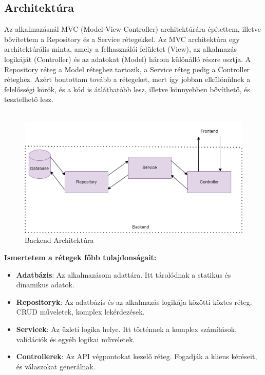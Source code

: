 \subsection*{Architektúra}
Az alkalmazásnál MVC (Model-View-Controller) architektúrára építettem, illetve
bővítettem a Repository és a Service rétegekkel. Az MVC architektúra egy
architektúrális minta, amely a felhasználói felületet (View), az alkalmazás
logikáját (Controller) és az adatokat (Model) három különálló részre osztja.
A Repository réteg a Model réteghez tartozik, a Service réteg pedig a Controller réteghez.
Azért bontottam tovább a rétegeket, mert így jobban elkülönülnek a felelősségi körök,
és a kód is átláthatóbb lesz, illetve könnyebben bővíthető, és tesztelhető lesz.
\\
\\
\begin{figure}[H]
    \centering
    \includegraphics[width=14.0truecm]{images/BackendArchitecture.png}
    \caption{Backend Architektúra}
    \label{fig:backend_architecture}
\end{figure}
\textbf{Ismertetem a rétegek főbb tulajdonságait:}
\begin{itemize}
    \item \textbf{Adatbázis}: Az alkalmazásom adattára. Itt tárolódnak a statikus és dinamikus adatok.
    \item \textbf{Repositoryk}: Az adatbázis és az alkalmazás logikája közötti köztes réteg. CRUD műveletek, komplex lekérdezések.
    \item \textbf{Servicek}: Az üzleti logika helye. Itt történnek a komplex számítások, validációk és egyéb logikai műveletek.
    \item \textbf{Controllerek}: Az API végpontokat kezelő réteg. Fogadják a kliens kéréseit, és válaszokat generálnak.
\end{itemize}

